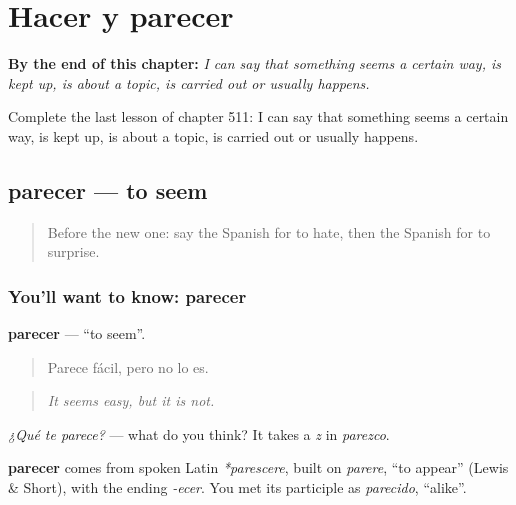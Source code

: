 
\chapter{Hacer y parecer}
\label{ch:es-hacer-y-parecer}

\begin{chapteropening}
\textbf{By the end of this chapter:} \emph{I can say that something seems a certain way, is kept up, is about a topic, is carried out or usually happens.}

Complete the last lesson of chapter 511: I can say that something seems a certain way, is kept up, is about a topic, is carried out or usually happens.
\end{chapteropening}

\section[parecer]{parecer — to seem}

\label{lesson:ES-C511-parecer}



\begin{quote}
Before the new one: say the Spanish for to hate, then the Spanish for to surprise.
\end{quote}

\subsection*{You'll want to know: parecer}
\textbf{parecer} — \textquotedblleft{}to seem\textquotedblright{}.

\begin{quote}
Parece fácil, pero no lo es.
\end{quote}

\begin{quote}
\emph{It seems easy, but it is not.}
\end{quote}

\emph{¿Qué te parece?} — what do you think? It takes a \emph{z} in \emph{parezco}.

\begin{cousinweb}
\textbf{parecer} comes from spoken Latin \emph{*parescere}, built on \emph{parere}, \textquotedblleft{}to appear\textquotedblright{} (Lewis \& Short), with the ending \emph{-ecer}. You met its participle as \emph{parecido}, \textquotedblleft{}alike\textquotedblright{}.
\end{cousinweb}

